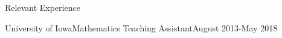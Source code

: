 \documentclass[hidelinks]{resume} %
\begin{document}
\begin{rSection}{Relevant Experience}

\begin{rSubsection}{University of Iowa}{}{Mathematics Teaching Assistant}{August 2013-May 2018}

\end{rSubsection}





\end{rSection}

\end{document}
